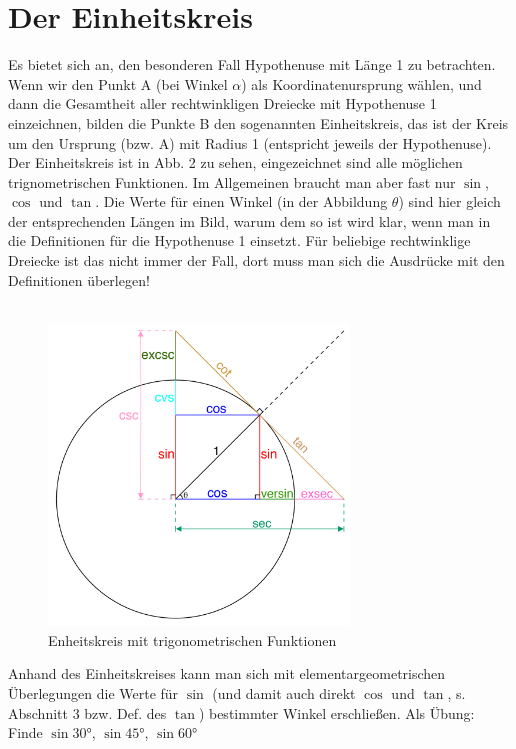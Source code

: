 \documentclass[11pt]{article}
\begin{document}
\section{Der Einheitskreis}
Es bietet sich an, den besonderen Fall Hypothenuse mit Länge 1 zu betrachten. Wenn wir den Punkt A (bei Winkel $\alpha$) als Koordinatenursprung wählen, und dann die Gesamtheit aller rechtwinkligen Dreiecke mit Hypothenuse 1 einzeichnen, bilden die Punkte B den sogenannten Einheitskreis, das ist der Kreis um den Ursprung (bzw. A) mit Radius 1 (entspricht jeweils der Hypothenuse). Der Einheitskreis ist in Abb. 2 zu sehen, eingezeichnet sind alle möglichen trignometrischen Funktionen. Im Allgemeinen braucht man aber fast nur $\sin$, $\cos$ und $\tan$. Die Werte für einen Winkel (in der Abbildung $\theta$) sind hier gleich der entsprechenden Längen im Bild, warum dem so ist wird klar, wenn man in die Definitionen für die Hypothenuse 1 einsetzt. Für beliebige rechtwinklige Dreiecke ist das nicht immer der Fall, dort muss man sich die Ausdrücke mit den Definitionen überlegen! \\\\
\begin{figure}[H]
    \includegraphics[width=8cm]{einheitskreis-trig-fkt.png}
    \centering
    \caption{Enheitskreis mit trigonometrischen Funktionen}
\end{figure} 
Anhand des Einheitskreises kann man sich mit elementargeometrischen Überlegungen die Werte für $\sin$ (und damit auch direkt $\cos$ und $\tan$, s. Abschnitt 3 bzw. Def. des $\tan$) bestimmter Winkel erschließen. Als Übung: Finde $\sin 30$°, $\sin 45$°, $\sin 60$° \\
\end{document}
